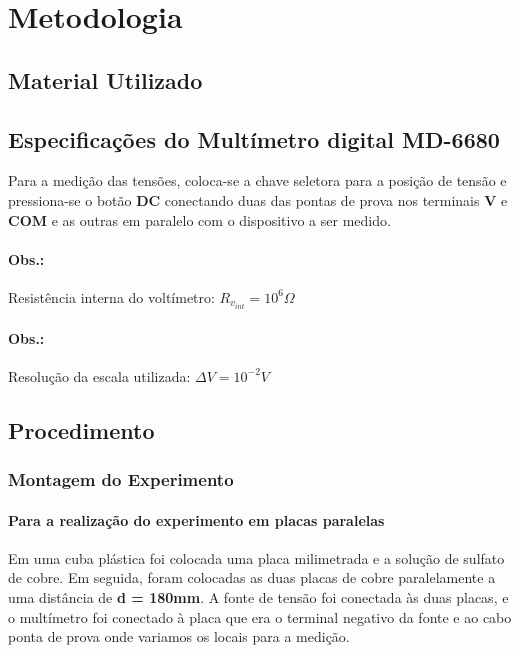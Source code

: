 \section{Metodologia}
    \subsection{Material Utilizado}
        

    \subsection{Especificações do Multímetro digital MD-6680}
        Para a medição das tensões, 
        coloca-se a chave seletora para a posição de tensão 
        e pressiona-se o botão \textbf{DC} conectando duas das pontas
        de prova nos terminais \textbf{V} e \textbf{COM} e as outras em 
        paralelo com o dispositivo a ser medido.
        \paragraph{Obs.:} Resistência interna do voltímetro: $R_{v_{int}} = 10^6 \Omega$ 
        \paragraph{Obs.:} Resolução da escala utilizada: $\Delta V = 10^{-2} V$ 

    \subsection{Procedimento}
        \subsubsection{Montagem do Experimento}
            \paragraph{Para a realização do experimento em placas paralelas}
            Em uma cuba plástica foi colocada uma placa milimetrada 
            e a solução de sulfato de cobre. Em seguida, foram 
            colocadas as duas placas de cobre paralelamente a 
            uma distância de \textbf{d = 180mm}. 
            A fonte de tensão foi conectada às duas placas, 
            e o multímetro foi conectado à placa que era o 
            terminal negativo da fonte e ao cabo ponta de prova 
            onde variamos os locais para a medição.
